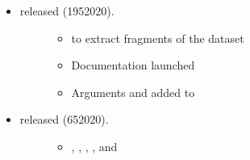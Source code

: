 \documentclass[a4paper,12pt,english]{sphinxhowto}
\begin{document}
\begin{itemize}
\item {} \begin{description}
\item[{ released (19\sphinxhyphen{}5\sphinxhyphen{}2020).}] \leavevmode\begin{itemize}
\item {} 
  to extract fragments of the  dataset

\end{itemize}
\begin{itemize}
\item {} 
Documentation  launched

\end{itemize}
\begin{itemize}
\item {} 
Arguments   and  added to 

\end{itemize}

\end{description}

\end{itemize}

\begin{itemize}
\item {} \begin{description}
\item[{ released (6\sphinxhyphen{}5\sphinxhyphen{}2020).}] \leavevmode\begin{itemize}
\item {} 
 , , , , and  

\end{itemize}

\end{description}

\end{itemize}
\end{document}
